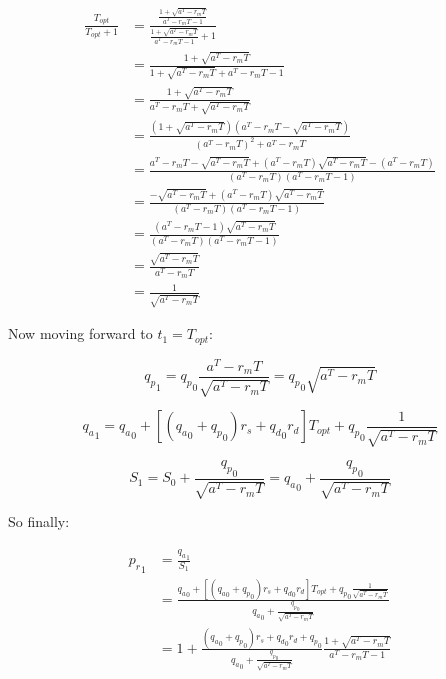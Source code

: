 \documentclass{article}
\begin{document}
\begin{equation}
  \label{eq:conservative_issuance_proportion}
  \begin{split}
  \frac{T_{opt}}{T_{opt} + 1} & = \frac{\frac{1+ \sqrt{a^T - r_mT}}{a^T - r_mT - 1}}{\frac{1+ \sqrt{a^T - r_mT}}{a^T - r_mT - 1} + 1} \\
  & = \frac{1+ \sqrt{a^T - r_mT}}{1+ \sqrt{a^T - r_mT} + a^T - r_mT - 1} \\
  & = \frac{1+ \sqrt{a^T - r_mT}}{a^T - r_mT + \sqrt{a^T - r_mT}} \\
  & = \frac{(1+ \sqrt{a^T - r_mT})(a^T - r_mT - \sqrt{a^T - r_mT})}{(a^T - r_mT)^2 + a^T - r_mT} \\
  & = \frac{a^T - r_mT - \sqrt{a^T - r_mT} + (a^T - r_mT)\sqrt{a^T - r_mT} - (a^T - r_mT)}{(a^T - r_mT)(a^T - r_mT - 1)} \\
  & = \frac{- \sqrt{a^T - r_mT} + (a^T - r_mT)\sqrt{a^T - r_mT}}{(a^T - r_mT)(a^T - r_mT - 1)} \\
  & = \frac{(a^T - r_mT - 1)\sqrt{a^T - r_mT}}{(a^T - r_mT)(a^T - r_mT - 1)} \\
  & = \frac{\sqrt{a^T - r_mT}}{a^T - r_mT} \\
  & = \frac{1}{\sqrt{a^T - r_mT}}
  \end{split}
\end{equation}

Now moving forward to $t_1 = T_{opt}$:

\[
{q_p}_1 = {q_p}_0 \frac{a^T -r_mT}{\sqrt{a^T -r_mT}} = {q_p}_0 \sqrt{a^T - r_mT}
\]

\[
{q_a}_1 = {q_a}_0 + [({q_a}_0 + {q_p}_0)r_s + {q_d}_0 r_d] T_{opt} + {q_p}_0 \frac{1}{\sqrt{a^T - r_mT}}
\]

\[
S_1 = S_0 + \frac{{q_p}_0}{\sqrt{a^T - r_mT}} = {q_a}_0 + \frac{{q_p}_0}{\sqrt{a^T - r_mT}}
\]

So finally:

\begin{equation}
  \label{eq:conservative_p_r_1}
  \begin{split}
    {p_r}_1 & = \frac{{q_a}_1}{S_1} \\
    & = \frac{{q_a}_0 + [({q_a}_0 + {q_p}_0)r_s + {q_d}_0 r_d] T_{opt} + {q_p}_0 \frac{1}{\sqrt{a^T - r_mT}}}{{q_a}_0 + \frac{{q_p}_0}{\sqrt{a^T - r_mT}}} \\
    & = 1 + \frac{({q_a}_0 + {q_p}_0)r_s + {q_d}_0 r_d + {q_p}_0}{{q_a}_0 + \frac{{q_p}_0}{\sqrt{a^T - r_mT}}} \frac{1+ \sqrt{a^T - r_mT}}{a^T - r_mT - 1} \\
  \end{split}
\end{equation}
\end{document}
